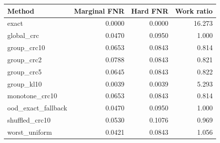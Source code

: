 \begin{tabular}{lrrr}
\hline
Method & Marginal FNR & Hard FNR & Work ratio \\
\hline
exact & 0.0000 & 0.0000 & 16.273 \\
global\_crc & 0.0470 & 0.0950 & 1.000 \\
group\_crc10 & 0.0653 & 0.0843 & 0.814 \\
group\_crc2 & 0.0788 & 0.0843 & 0.821 \\
group\_crc5 & 0.0645 & 0.0843 & 0.822 \\
group\_kl10 & 0.0039 & 0.0039 & 5.293 \\
monotone\_crc10 & 0.0653 & 0.0843 & 0.814 \\
ood\_exact\_fallback & 0.0470 & 0.0950 & 1.000 \\
shuffled\_crc10 & 0.0530 & 0.1076 & 0.969 \\
worst\_uniform & 0.0421 & 0.0843 & 1.056 \\
\hline
\end{tabular}

